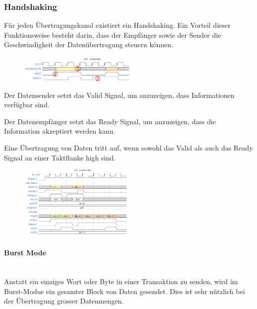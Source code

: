 \begin{multicols}{2}
    \subsubsection{Handshaking}
    Für jeden Übertragungskanal existiert ein Handshaking. Ein Vorteil dieser Funktionsweise besteht darin, dass der Empfänger sowie der Sender die Geschwindigkeit der Datenübertragung steuern können.
     \begin{figure}[H]
     	\includegraphics[width=0.5\textwidth]{images/AXI_Handshaking.png}
     \end{figure}
\end{multicols}
\begin{compactenum}
    \item Der Datensender setzt das Valid Signal, um anzuzeigen, dass Informationen verfügbar sind.
    \item Der Datenempfänger setzt das Ready Signal, um anzuzeigen, dass die Information akzeptiert werden kann.
    \item Eine Übertragung von Daten tritt auf, wenn sowohl das Valid als auch das Ready Signal an einer Taktflanke high sind.
\end{compactenum}

\begin{multicols}{2}
    \begin{figure}[H]
     	\includegraphics[width=0.5\textwidth]{images/AXI_Burst_Transfer.png}
     \end{figure}
    \paragraph{Burst Mode}$~$ \\
    Anstatt ein einziges Wort oder Byte in einer Transaktion zu senden, wird  im Burst-Modus ein gesamter Block von Daten gesendet. Dies ist sehr nützlich bei der Übertragung grosser Datenmengen.
\end{multicols}

